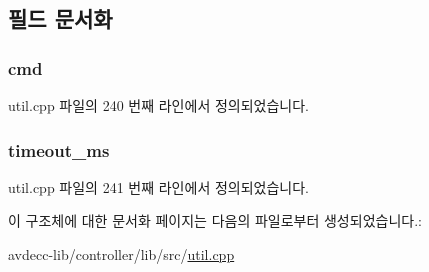\subsection{필드 문서화}
\subsubsection[{\texorpdfstring{cmd}{cmd}}]{ cmd}\hypertarget{structavdecc__lib_1_1utility_1_1acmp__command__and__timeout_a5e9712b08d7cbf6091f9e5334ff97b5d}{}\label{structavdecc__lib_1_1utility_1_1acmp__command__and__timeout_a5e9712b08d7cbf6091f9e5334ff97b5d}


util.\+cpp 파일의 240 번째 라인에서 정의되었습니다.

\subsubsection[{\texorpdfstring{timeout\+\_\+ms}{timeout_ms}}]{ timeout\+\_\+ms}\hypertarget{structavdecc__lib_1_1utility_1_1acmp__command__and__timeout_aca14dfa629015ee4cc42bd01d9933944}{}\label{structavdecc__lib_1_1utility_1_1acmp__command__and__timeout_aca14dfa629015ee4cc42bd01d9933944}


util.\+cpp 파일의 241 번째 라인에서 정의되었습니다.



이 구조체에 대한 문서화 페이지는 다음의 파일로부터 생성되었습니다.\+:\begin{DoxyCompactItemize}
\item 
avdecc-\/lib/controller/lib/src/\hyperlink{util_8cpp}{util.\+cpp}\end{DoxyCompactItemize}
